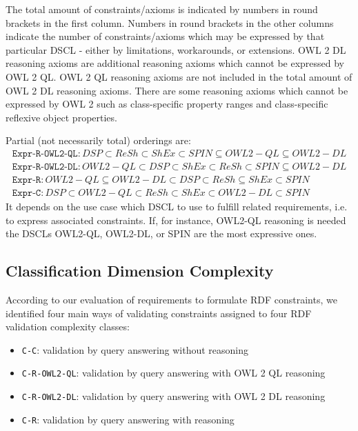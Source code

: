 \documentclass{llncs}
\newcommand{\ms}[1]{\texttt{#1}}
\newcommand{\tb}[1]{\todo[size=\small, color=green!40]{\textbf{Thomas:} #1}}
\begin{document}
\tb{ToDo Thomas: refer to table}

The total amount of constraints/axioms is indicated by numbers in round brackets in the first column.
Numbers in round brackets in the other columns indicate the number of constraints/axioms which may be expressed by that particular DSCL - either by limitations, workarounds, or extensions.  
OWL 2 DL reasoning axioms are additional reasoning axioms which cannot be expressed by OWL 2 QL. 
OWL 2 QL reasoning axioms are not included in the total amount of OWL 2 DL reasoning axioms.
There are some reasoning axioms which cannot be expressed by OWL 2 such as class-specific property ranges and class-specific reflexive object properties.

Partial (not necessarily total) orderings are:
\begin{eqnarray*}
\ms{Expr-R-OWL2-QL}: DSP \subset ReSh \subset ShEx \subset SPIN \subseteq OWL2-QL \subseteq OWL2-DL \\
\ms{Expr-R-OWL2-DL}: OWL2-QL \subset DSP \subset ShEx \subset ReSh \subset SPIN \subseteq OWL2-DL \\
\ms{Expr-R}: OWL2-QL \subseteq OWL2-DL \subset DSP \subset ReSh \subseteq ShEx \subset SPIN \\
\ms{Expr-C}: DSP \subset OWL2-QL \subset ReSh \subset ShEx \subset OWL2-DL \subset SPIN
\end{eqnarray*}
It depends on the use case which DSCL to use to fulfill related requirements, i.e. to express associated constraints.
If, for instance, OWL2-QL reasoning is needed the DSCLs OWL2-QL, OWL2-DL, or SPIN are the most expressive ones.

\subsection{Classification Dimension Complexity}

According to our evaluation of requirements to formulate RDF constraints, we identified four main ways of validating constraints assigned to four RDF validation complexity classes:

\begin{itemize}
	\item \ms{C-C}: validation by query answering without reasoning
	\item \ms{C-R-OWL2-QL}: validation by query answering with OWL 2 QL reasoning
	\item \ms{C-R-OWL2-DL}: validation by query answering with OWL 2 DL reasoning
	\item \ms{C-R}: validation by query answering with reasoning
\end{itemize}
\end{document}

